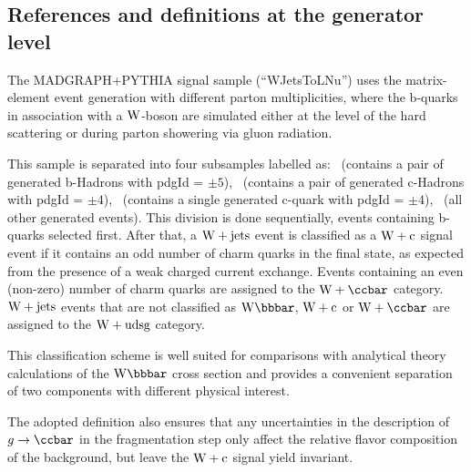 {%


\subsection{References and definitions at the generator level~\label{sec:normalization}}

The MADGRAPH+PYTHIA signal sample (``WJetsToLNu'') uses the matrix-element
event generation with different parton multiplicities, where
the b-quarks in association with a $\mathrm{W}$-boson are simulated either at 
the level of the hard scattering 
or during parton showering via gluon radiation. 


This sample is separated into four subsamples labelled as:
\Wbb ~(contains a pair of generated b-Hadrons with pdgId = $\pm 5$), 
\Wcc ~(contains a pair of generated c-Hadrons with pdgId = $\pm 4$), 
\Wc ~(contains a single generated c-quark with pdgId = $\pm 4$), 
\Wudsg ~(all other generated events). 
This division is done sequentially, events containing b-quarks selected first.
After that, a $\mathrm{W + jets}$ event is classified as a $\mathrm{W+c}$ signal event if it contains an odd number of charm
quarks in the final state, as expected from the presence of a weak charged current
exchange. Events containing an even (non-zero) number of charm quarks
are assigned to the $\Wcc$ category. 
$\mathrm{W + jets}$ events that are not classified as $\Wbb$, $\mathrm{W+c}$ or $\Wcc$ are
assigned to the $\mathrm{W+udsg}$ category.

This classification scheme is well suited for comparisons with analytical theory
calculations of the $\Wbb$ cross section and provides a convenient separation of two
components with different physical interest. 

The adopted definition also ensures that any uncertainties in the
description of $g\to\ccbar$ in the fragmentation step only affect
the relative flavor composition of the background, but leave the $\mathrm{W+c}$ signal
yield invariant.

}
